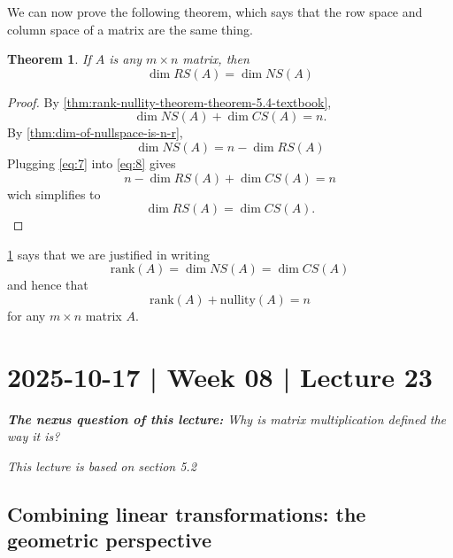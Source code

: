 \documentclass[10pt]{article}
\newtheorem{theorem}{Theorem}
\theoremstyle{definition}
\newcommand{\rank}{\mathrm{rank}} %
\begin{document}
We can now prove the following theorem, which says that the row space and
column space of a matrix are the same thing.
\begin{theorem}
  \label{thm:rowspace-columnspace-same-dimension}
  If $A$ is any $m\times n$ matrix, then
  \begin{equation*}
    \dim RS(A) = \dim NS(A)
  \end{equation*}
\end{theorem}
\begin{proof}
  By \cref{thm:rank-nullity-theorem-theorem-5.4-textbook},
 \begin{equation}\label{eq:8}
   \dim NS(A) + \dim CS(A)=n.
 \end{equation}
 By \cref{thm:dim-of-nullspace-is-n-r},
 \begin{equation}\label{eq:7}
   \dim NS(A) = n- \dim RS(A)
 \end{equation}
 Plugging \cref{eq:7} into \cref{eq:8} gives
 \begin{equation*}
   n-\dim RS(A)+ \dim CS(A)=n
 \end{equation*}
 wich simplifies to
 \begin{equation*}
   \dim RS(A)=\dim CS(A).
 \end{equation*}
\end{proof}

\cref{thm:rowspace-columnspace-same-dimension} says that we are justified in
writing
\begin{equation*}
  \rank(A) = \dim NS(A) = \dim CS(A)
\end{equation*}
and hence that
\begin{equation*}
  \rank(A) + \mathrm{nullity}(A)=n
\end{equation*}
for any $m\times n$ matrix $A$.

\newpage
\section{2025-10-17 | Week 08 | Lecture 23}
\begin{center}
  \begin{tcolorbox}[width=0.9\textwidth, colback=white, colframe=black]
    \textit{\textbf{The nexus question of this lecture:} Why is matrix
      multiplication defined the way it is?}
  \end{tcolorbox}
\end{center}
\textit{This lecture is based on section 5.2}

\subsection{Combining linear transformations: the geometric perspective}
\end{document}
